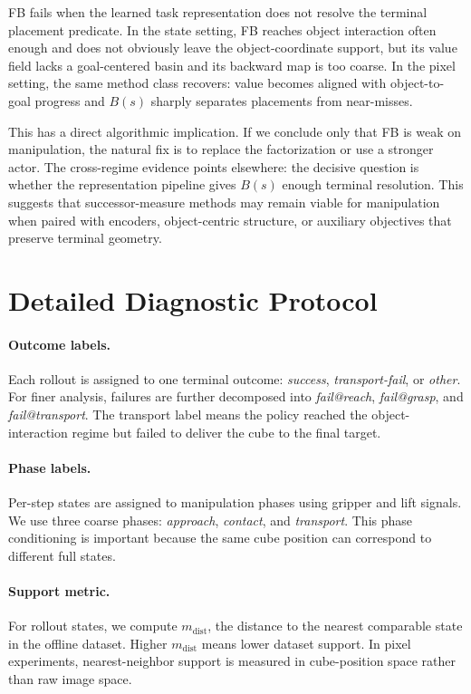 \documentclass{article}
\newcommand{\mnn}{m_{\mathrm{dist}}}
\begin{document}
FB fails when the learned task representation does not resolve the terminal placement predicate. 
In the state setting, FB reaches object interaction often enough and does not obviously leave the object-coordinate support, but its value field lacks a goal-centered basin and its backward map is too coarse. In the pixel setting, the same method class recovers: value becomes aligned with object-to-goal progress and $B(s)$ sharply separates placements from near-misses.

This has a direct algorithmic implication. 
If we conclude only that FB is weak on manipulation, the natural fix is to replace the factorization or use a stronger actor. 
The cross-regime evidence points elsewhere: the decisive question is whether the representation pipeline gives $B(s)$ enough terminal resolution. 
This suggests that successor-measure methods may remain viable for manipulation when paired with encoders, object-centric structure, or auxiliary objectives that preserve terminal geometry.

\clearpage
\appendix

\section{Detailed Diagnostic Protocol}
\label{app:diagnostic-protocol}

\paragraph{Outcome labels.}
Each rollout is assigned to one terminal outcome: \emph{success}, \emph{transport-fail}, or \emph{other}. For finer analysis, failures are further decomposed into \emph{fail@reach}, \emph{fail@grasp}, and \emph{fail@transport}. The transport label means the policy reached the object-interaction regime but failed to deliver the cube to the final target.

\paragraph{Phase labels.}
Per-step states are assigned to manipulation phases using gripper and lift signals. We use three coarse phases: \emph{approach}, \emph{contact}, and \emph{transport}. This phase conditioning is important because the same cube position can correspond to different full states.

\paragraph{Support metric.}
For rollout states, we compute $\mnn$, the distance to the nearest comparable state in the offline dataset. Higher $\mnn$ means lower dataset support. In pixel experiments, nearest-neighbor support is measured in cube-position space rather than raw image space.
\end{document}
